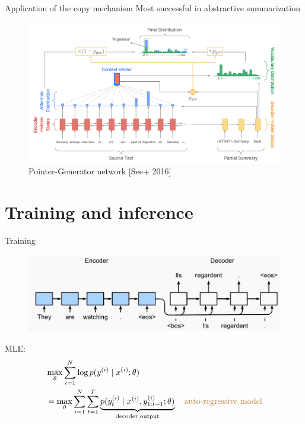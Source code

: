 \documentclass[usenames,dvipsnames,notes]{beamer}
\begin{document}
\begin{frame}
    {Application of the copy mechanism}
    Most successful in abstractive summarization
    \vspace{-1em}
    \begin{figure}
        \includegraphics[width=12cm]{figures/pg}
        \caption{Pointer-Generator network [See+ 2016]}
    \end{figure}
\end{frame}

\section{Training and inference}

\begin{frame}
    {Training}
    \begin{figure}
        \includegraphics[width=12cm]{figures/s2s-training}
    \end{figure}
    MLE:
    \begin{align*}
        & \max_{\theta} \sum_{i=1}^N \log p(y^{(i)}\mid x^{(i)}; \theta) \\
        &= \max_{\theta} \sum_{i=1}^N \sum_{t=1}^T \underbrace{p(y^{(i)}_t \mid x^{(i)}, y^{(i)}_{1:t-1}; \theta)}_{\text{decoder output}} \quad \text{\textcolor{brown}{auto-regressive model}}
    \end{align*}
\end{frame}
\end{document}
